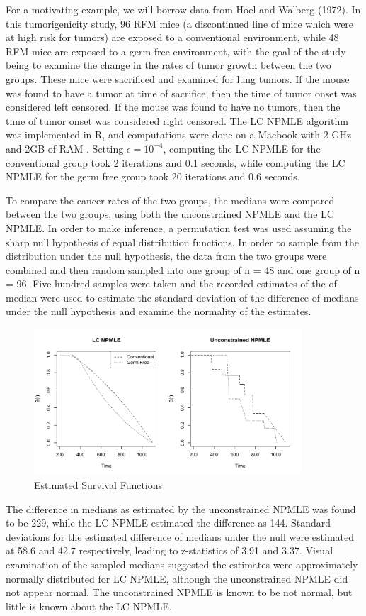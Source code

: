 	For a motivating example, we will borrow data from Hoel and Walberg (1972). In this tumorigenicity study, 96 RFM mice (a discontinued line of mice which were at high risk for tumors) are exposed to a conventional environment, while 48 RFM mice are exposed to a germ free environment, with the goal of the study being to examine the change in the rates of tumor growth between the two groups. These mice were sacrificed and examined for lung tumors. If the mouse was found to have a tumor at time of sacrifice, then the time of tumor onset was considered left censored. If the mouse was found to have no tumors, then the time of tumor onset was considered right censored. The LC NPMLE algorithm was implemented in R, and computations were done on a Macbook with 2 GHz and 2GB of RAM . Setting $\epsilon = 10^{-4}$, computing the LC NPMLE for the conventional group took 2 iterations and 0.1 seconds, while computing the LC NPMLE for the germ free group took 20 iterations and 0.6 seconds. 
	
	To compare the cancer rates of the two groups, the medians were compared between the two groups, using both the unconstrained NPMLE and the LC NPMLE. In order to make inference, a permutation test was used assuming the sharp null hypothesis of equal distribution functions. In order to sample from the distribution under the null hypothesis, the data from the two groups were combined and then random sampled into one group of n = 48 and one group of n = 96. Five hundred samples were taken and the recorded estimates of the of median were used to estimate the standard deviation of the difference of medians under the null hypothesis and examine the normality of the estimates.
	
\begin{figure}
\centerline{\includegraphics[width = 10cm]{TumorPlots.pdf}}
\caption{Estimated Survival Functions}
\end{figure}		

	The difference in medians as estimated by the unconstrained NPMLE was found to be 229, while the LC NPMLE estimated the difference as 144. Standard deviations for the estimated difference of medians under the null were estimated at 58.6 and 42.7 respectively, leading to z-statistics of 3.91 and 3.37. Visual examination of the sampled medians suggested the estimates were approximately normally distributed for LC NPMLE, although the unconstrained NPMLE did not appear normal. The unconstrained NPMLE is known to be not normal, but little is known about the LC NPMLE.

